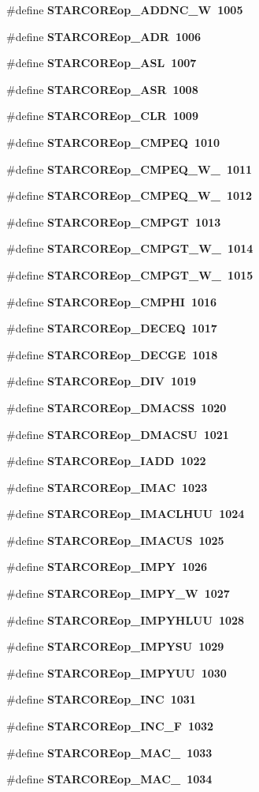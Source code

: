 \begin{CompactItemize}
\#define \bf{STARCOREop\_\-ADDNC\_\-W}~1005
\item 
\#define \bf{STARCOREop\_\-ADR}~1006
\item 
\#define \bf{STARCOREop\_\-ASL}~1007
\item 
\#define \bf{STARCOREop\_\-ASR}~1008
\item 
\#define \bf{STARCOREop\_\-CLR}~1009
\item 
\#define \bf{STARCOREop\_\-CMPEQ}~1010
\item 
\#define \bf{STARCOREop\_\-CMPEQ\_\-W\_}~1011
\item 
\#define \bf{STARCOREop\_\-CMPEQ\_\-W\_}~1012
\item 
\#define \bf{STARCOREop\_\-CMPGT}~1013
\item 
\#define \bf{STARCOREop\_\-CMPGT\_\-W\_}~1014
\item 
\#define \bf{STARCOREop\_\-CMPGT\_\-W\_}~1015
\item 
\#define \bf{STARCOREop\_\-CMPHI}~1016
\item 
\#define \bf{STARCOREop\_\-DECEQ}~1017
\item 
\#define \bf{STARCOREop\_\-DECGE}~1018
\item 
\#define \bf{STARCOREop\_\-DIV}~1019
\item 
\#define \bf{STARCOREop\_\-DMACSS}~1020
\item 
\#define \bf{STARCOREop\_\-DMACSU}~1021
\item 
\#define \bf{STARCOREop\_\-IADD}~1022
\item 
\#define \bf{STARCOREop\_\-IMAC}~1023
\item 
\#define \bf{STARCOREop\_\-IMACLHUU}~1024
\item 
\#define \bf{STARCOREop\_\-IMACUS}~1025
\item 
\#define \bf{STARCOREop\_\-IMPY}~1026
\item 
\#define \bf{STARCOREop\_\-IMPY\_\-W}~1027
\item 
\#define \bf{STARCOREop\_\-IMPYHLUU}~1028
\item 
\#define \bf{STARCOREop\_\-IMPYSU}~1029
\item 
\#define \bf{STARCOREop\_\-IMPYUU}~1030
\item 
\#define \bf{STARCOREop\_\-INC}~1031
\item 
\#define \bf{STARCOREop\_\-INC\_\-F}~1032
\item 
\#define \bf{STARCOREop\_\-MAC\_}~1033
\item 
\#define \bf{STARCOREop\_\-MAC\_}~1034
\item 

\end{CompactItemize}
